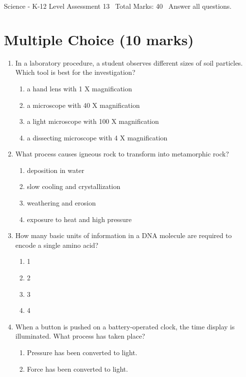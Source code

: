 \documentclass[12pt]{article}
\begin{document}
\begin{center}
Science - K-12 Level Assessment 13 \
Total Marks: 40 \
Answer all questions.
\end{center}

\section*{Multiple Choice (10 marks)}
\begin{enumerate}[label=\arabic*.]
\item In a laboratory procedure, a student observes different sizes of soil particles. Which tool is best for the investigation?
\begin{enumerate}[label=(\alph*)]
    \item a hand lens with 1 X magnification
    \item a microscope with 40 X magnification
    \item a light microscope with 100 X magnification
    \item a dissecting microscope with 4 X magnification
\end{enumerate}
\item What process causes igneous rock to transform into metamorphic rock?
\begin{enumerate}[label=(\alph*)]
    \item deposition in water
    \item slow cooling and crystallization
    \item weathering and erosion
    \item exposure to heat and high pressure
\end{enumerate}
\item How many basic units of information in a DNA molecule are required to encode a single amino acid?
\begin{enumerate}[label=(\alph*)]
    \item 1
    \item 2
    \item 3
    \item 4
\end{enumerate}
\item When a button is pushed on a battery-operated clock, the time display is illuminated. What process has taken place?
\begin{enumerate}[label=(\alph*)]
    \item Pressure has been converted to light.
    \item Force has been converted to light.

\end{enumerate}
\end{enumerate}
\end{document}
